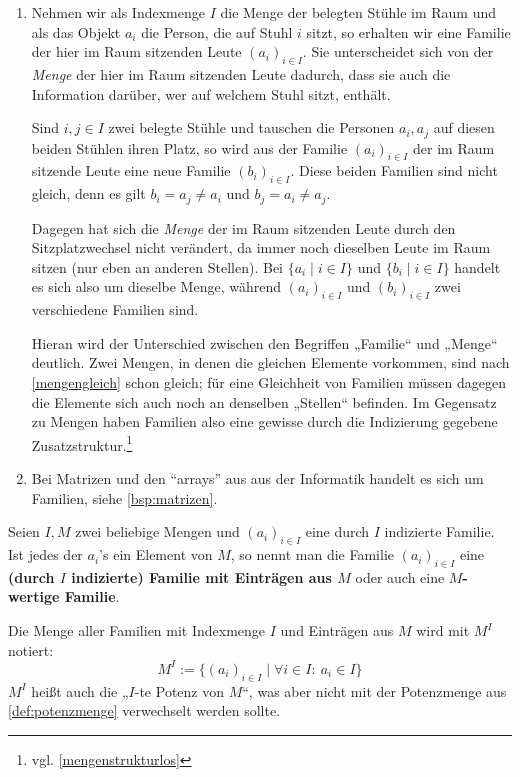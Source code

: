 \begin{bsp} \quad
    \begin{enumerate}
	\item Nehmen wir als Indexmenge $I$ die Menge der belegten Stühle im Raum und als das Objekt $a_i$ die Person, die auf Stuhl $i$ sitzt, so erhalten wir eine Familie der hier im Raum sitzenden Leute $(a_i)_{i\in I}$. Sie unterscheidet sich von der \textit{Menge} der hier im Raum sitzenden Leute dadurch, dass sie auch die Information darüber, wer auf welchem Stuhl sitzt, enthält.
	
	Sind $i,j\in I$ zwei belegte Stühle und tauschen die Personen $a_i,a_j$ auf diesen beiden Stühlen ihren Platz, so wird aus der Familie $(a_i)_{i\in I}$ der im Raum sitzende Leute eine neue Familie $(b_i)_{i\in I}$. Diese beiden Familien sind nicht gleich, denn es gilt $b_i=a_j\neq a_i$ und $b_j=a_i\neq a_j$.
	
	Dagegen hat sich die \emph{Menge} der im Raum sitzenden Leute durch den Sitzplatzwechsel nicht verändert, da immer noch dieselben Leute im Raum sitzen (nur eben an anderen Stellen). Bei $\{a_i\mid i\in I\}$ und $\{b_i \mid i\in I\}$ handelt es sich also um dieselbe Menge, während $(a_i)_{i\in I}$ und $(b_i)_{i\in I}$ zwei verschiedene Familien sind.
	
        Hieran wird der Unterschied zwischen den Begriffen „Familie“ und „Menge“ deutlich. Zwei Mengen, in denen die gleichen Elemente vorkommen, sind nach \cref{mengengleich} schon gleich; für eine Gleichheit von Familien müssen dagegen die Elemente sich auch noch an denselben „Stellen“ befinden. Im Gegensatz zu Mengen haben Familien also eine gewisse durch die Indizierung gegebene Zusatzstruktur.\footnote{vgl. \cref{mengenstrukturlos}}
	\item Bei Matrizen und den ``arrays'' aus aus der Informatik handelt es sich um Familien, siehe \cref{bsp:matrizen}.
    \end{enumerate}
\end{bsp}


\begin{de} \label{def:mengenpotenz}
    Seien $I,M$ zwei beliebige Mengen und $(a_i)_{i\in I}$ eine durch $I$ indizierte Familie. Ist jedes der $a_i$'s ein Element von $M$, so nennt man die Familie $(a_i)_{i\in I}$ eine \textbf{(durch $I$ indizierte) Familie mit Einträgen aus $M$} oder auch eine \textbf{$M$-wertige Familie}.
    
    Die Menge aller Familien mit Indexmenge $I$ und Einträgen aus $M$ wird mit $M^I$ notiert:
        \[ M^I := \{ (a_i)_{i\in I} \mid \forall i\in I:\ a_i \in I \} \]
    $M^I$ heißt auch die „$I$-te Potenz von $M$“, was aber nicht mit der Potenzmenge aus \cref{def:potenzmenge} verwechselt werden sollte.
\end{de}



